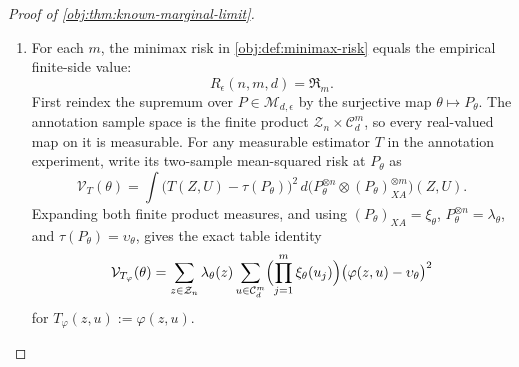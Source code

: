 \begin{proof}[Proof of \cref{obj:thm:known-marginal-limit}]
\begin{enumerate}
\item\label{pf:known-marginal-limit:empirical-risk} For each \(m\), the minimax risk in \cref{obj:def:minimax-risk} equals the empirical finite-side value:
\[
R_\epsilon(n,m,d)=\mathfrak R_m .
\]
First reindex the supremum over \(P\in\mathcal M_{d,\epsilon}\) by the surjective map \(\theta\mapsto P_\theta\).  The annotation sample space is the
finite product \(\mathcal Z_n\times\mathcal C_d^m\), so every real-valued
map on it is measurable.  For any measurable estimator \(T\) in the annotation experiment, write its two-sample mean-squared risk at \(P_\theta\) as
\[
\mathcal V_T(\theta)
=
\int
\bigl(T(Z,U)-\tau(P_\theta)\bigr)^2
\,d\bigl(P_\theta^{\otimes n}\otimes (P_\theta)_{XA}^{\otimes m}\bigr)(Z,U).
\]
Expanding both finite product measures, and using
\((P_\theta)_{XA}=\xi_\theta\),
\(P_\theta^{\otimes n}=\lambda_\theta\), and
\(\tau(P_\theta)=\upsilon_\theta\), gives the exact table identity
\[
\mathcal V_{T_\varphi}(\theta)
=
\sum_{z\in\mathcal Z_n}\lambda_\theta(z)
\sum_{u\in\mathcal C_d^m}
\Bigl(\prod_{j=1}^m\xi_\theta(u_j)\Bigr)
\bigl(\varphi(z,u)-\upsilon_\theta\bigr)^2
\]
for \(T_\varphi(z,u):=\varphi(z,u)\).


\end{enumerate}
\end{proof}
